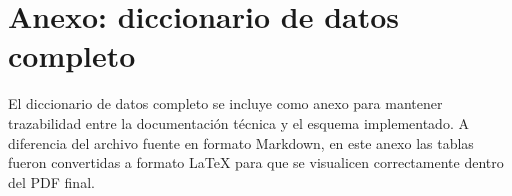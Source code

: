 \section{Anexo: diccionario de datos completo}

El diccionario de datos completo se incluye como anexo para mantener trazabilidad entre la documentación técnica y el esquema implementado. A diferencia del archivo fuente en formato Markdown, en este anexo las tablas fueron convertidas a formato LaTeX para que se visualicen correctamente dentro del PDF final.



